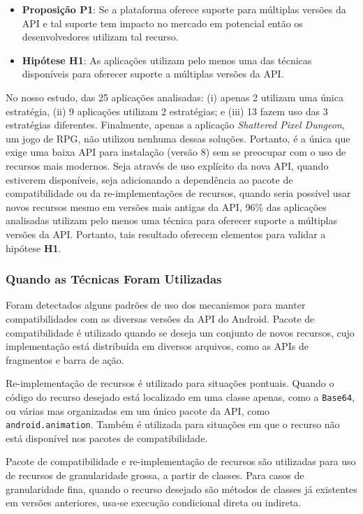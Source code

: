 \begin{itemize}
	\item \textbf{Proposição P1}: Se a plataforma oferece suporte para múltiplas versões
	da API e tal suporte tem impacto no mercado em potencial então os desenvolvedores
	utilizam tal recurso.
	\item \textbf{Hipótese H1}: As aplicações utilizam pelo menos uma das técnicas disponíveis
	para oferecer suporte a múltiplas versões da API.
\end{itemize}

No nosso estudo, das 25 aplicações analisadas: (i) apenas 2 utilizam uma única
estratégia, (ii) 9 aplicações utilizam 2 estratégias; e (iii) 13 fazem uso das
3 estratégias diferentes. Finalmente, apenas a aplicação \textit{Shattered Pixel
Dungeon}, um jogo de RPG, não utilizou nenhuma dessas soluções. Portanto, é a
única que exige uma baixa API para instalação (versão 8) sem se preocupar com
o uso de recursos mais modernos. Seja através de uso explícito da nova API,
quando estiverem disponíveis, seja adicionando a dependência ao pacote de
compatibilidade ou da re-implementações de recursos, quando seria possível
usar novos recursos mesmo em versões mais antigas da API, 96\% das aplicações
analisadas utilizam pelo menos uma técnica para oferecer suporte a múltiplas
versões da API. Portanto, tais resultado oferecem elementos
para validar a hipótese \textbf{H1}.

\subsubsection{Quando as Técnicas Foram Utilizadas}

Foram detectados alguns padrões de uso dos mecanismos para manter compatibilidades com
as diversas versões da API do Android. Pacote de compatibilidade é utilizado quando se
deseja um conjunto de novos recursos, cujo implementação está distribuída em diversos
arquivos, como as APIs de fragmentos e barra de ação.

Re-implementação de recursos é utilizado para situações pontuais. Quando o código do
recurso desejado está localizado em uma classe apenas, como a \texttt{Base64},  ou
várias mas organizadas em um único pacote da API, como \texttt{android.animation}.
Também é utilizada para situações em que o recurso não está disponível nos pacotes
de compatibilidade.

Pacote de compatibilidade e re-implementação de recursos são utilizadas para uso de
recursos de granularidade grossa, a partir de classes. Para casos de granularidade
fina, quando o recurso desejado são métodos de classes já existentes em versões
anteriores, usa-se execução condicional direta ou indireta.

